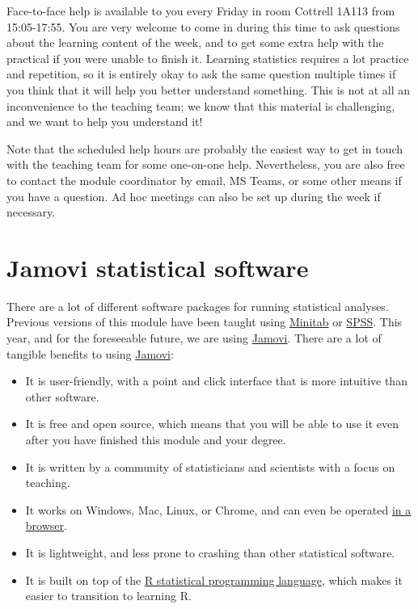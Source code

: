 \documentclass[
]{scrbook}
\providecommand{\tightlist}{%
  \setlength{\itemsep}{0pt}\setlength{\parskip}{0pt}}
\begin{document}
Face-to-face help is available to you every Friday in room Cottrell 1A113 from 15:05-17:55.
You are very welcome to come in during this time to ask questions about the learning content of the week, and to get some extra help with the practical if you were unable to finish it.
Learning statistics requires a lot practice and repetition, so it is entirely okay to ask the same question multiple times if you think that it will help you better understand something.
This is not at all an inconvenience to the teaching team; we know that this material is challenging, and we want to help you understand it!

Note that the scheduled help hours are probably the easiest way to get in touch with the teaching team for some one-on-one help.
Nevertheless, you are also free to contact the module coordinator by email, MS Teams, or some other means if you have a question.
Ad hoc meetings can also be set up during the week if necessary.

\hypertarget{jamovi}{%
\section*{Jamovi statistical software}\label{jamovi}}

There are a lot of different software packages for running statistical analyses.
Previous versions of this module have been taught using \href{https://www.minitab.com/en-us/}{Minitab} or \href{https://www.ibm.com/uk-en/products/spss-statistics}{SPSS}.
This year, and for the foreseeable future, we are using \href{https://www.jamovi.org/}{Jamovi}.
There are a lot of tangible benefits to using \href{https://www.jamovi.org/}{Jamovi}:

\begin{itemize}
\tightlist
\item
  It is user-friendly, with a point and click interface that is more intuitive than other software.
\item
  It is free and open source, which means that you will be able to use it even after you have finished this module and your degree.
\item
  It is written by a community of statisticians and scientists with a focus on teaching.
\item
  It works on Windows, Mac, Linux, or Chrome, and can even be operated \href{https://www.jamovi.org/cloud.html}{in a browser}.
\item
  It is lightweight, and less prone to crashing than other statistical software.
\item
  It is built on top of the \href{https://www.r-project.org/about.html}{R statistical programming language}, which makes it easier to transition to learning R.
\end{itemize}
\end{document}
